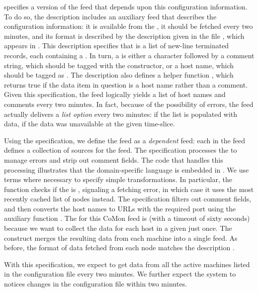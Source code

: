  specifies a version of the  feed that
depends upon this configuration information.  To do so, the
description includes an auxiliary feed  that describes the
configuration information: it is available from the
, it should be fetched every two minutes, and its
format is described by the \padsml{} description  given in
the file , which appears in .
This \padsml{} description specifies that  is a list of
new-line terminated records, each containing a .  In
turn, a  is either a  character followed by a
comment string, which should be tagged with the 
constructor, or a host name, which should be tagged as
. The description also defines a helper function ,
which returns true if the data item in question is a host name
rather than a comment.  Given this specification, the  feed
logically yields a list of host names and comments every two minutes.
In fact, because of the possibility of errors, the feed actually
delivers a {\em list option} every two minutes:  if the list is
populated with data,  if the data was unavailable at the
given time-slice.

Using the  specification, we define the  feed as a
\textit{dependent} feed: each  in the  feed defines a
collection of sources for the  feed.  The  
specification processes the  to manage errors and strip
out comment fields.  The code that handles this processing illustrates
that the \padsd{} domain-specific language is embedded in \ocaml{}.
We use \ocaml{} terms where necessary to specify simple
transformations.  In particular, the  function checks if
the  is , signaling a fetching error, in which
case it uses the most recently cached list of nodes instead.  The
 specification filters out comment fields, and then
converts the host names to URLs with the required port using the
auxiliary function .  The  for this CoMon
feed is  (with a timeout of sixty seconds) because we want to
collect the data for each host in a given  just once.
The  construct merges the resulting data from
each machine into a single feed.  As
before, the format of data fetched from each node matches the
description .  

With this specification, we
expect to get data from all the active machines listed in the
configuration file every two minutes.  We further expect the system to
notices changes in the configuration file within two minutes.





